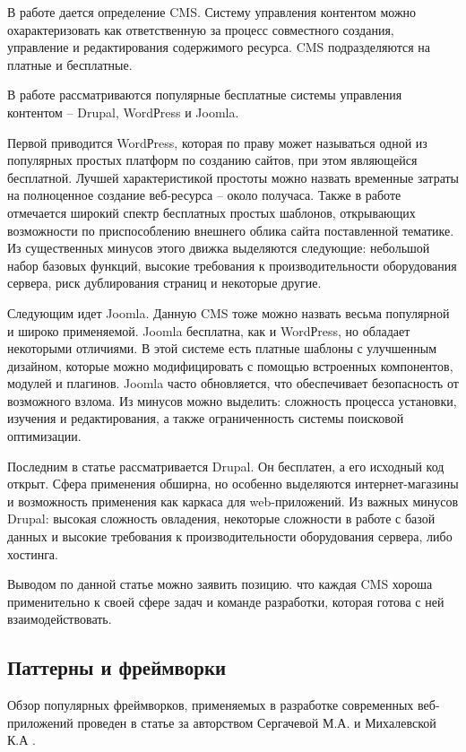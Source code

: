 В работе дается определение CMS.
Систему управления контентом можно охарактеризовать как ответственную за процесс совместного создания, управление и редактирования содержимого ресурса.
CMS подразделяются на платные и бесплатные.

В работе рассматриваются популярные бесплатные системы управления контентом -- Drupal, WordРress и Joomla.

Первой приводится WordРress, которая по праву может называться одной из популярных простых платформ по созданию сайтов, при этом являющейся бесплатной.
Лучшей характеристикой простоты можно назвать временные затраты на полноценное создание веб-ресурса -- около получаса.
Также в работе отмечается широкий спектр бесплатных простых шаблонов, открывающих возможности по приспособлению внешнего облика сайта поставленной тематике.
Из существенных минусов этого движка выделяются следующие: небольшой набор базовых функций, высокие требования к производительности оборудования сервера, риск дублирования страниц и некоторые другие.

Следующим идет Joomla.
Данную CMS тоже можно назвать весьма популярной и широко применяемой.
Joomla бесплатна, как и WordРress, но обладает некоторыми отличиями.
В этой системе есть платные шаблоны с улучшенным дизайном, которые можно модифицировать с помощью встроенных компонентов, модулей и плагинов.
Joomla часто обновляется, что обеспечивает безопасность от возможного взлома.
Из минусов можно выделить: сложность процесса установки, изучения и редактирования, а также ограниченность системы поисковой оптимизации.

Последним в статье рассматривается Drupal.
Он бесплатен, а его исходный код открыт.
Сфера применения обширна, но особенно выделяются интернет-магазины и возможность применения как каркаса для web-приложений.
Из важных минусов Drupal: высокая сложность овладения, некоторые сложности в работе с базой данных и высокие требования к производительности оборудования сервера, либо хостинга.

Выводом по данной статье можно заявить позицию. что каждая CMS хороша применительно к своей сфере задач и команде разработки, которая готова с ней взаимодействовать.

\clearpage


\subsection{Паттерны и фреймворки}

Обзор популярных фреймворков, применяемых в разработке современных веб-приложений проведен в статье за авторством Сергачевой М.А. и Михалевской К.А \cite{sergacheva-framework}.

